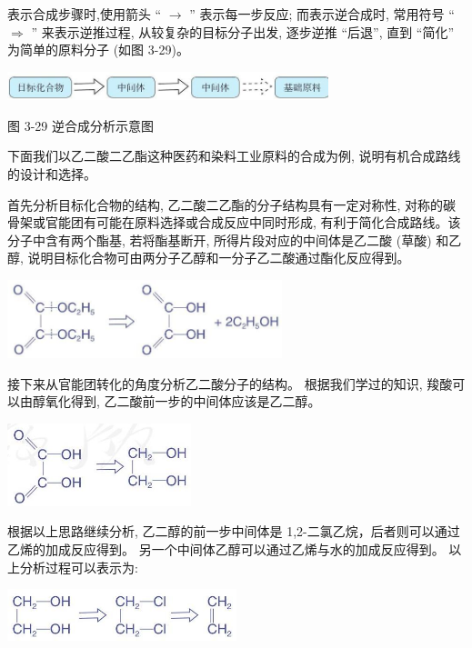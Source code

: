 \documentclass[10pt]{article}
\begin{document}
表示合成步骤时,使用箭头 “ \(\rightarrow\) ” 表示每一步反应; 而表示逆合成时, 常用符号 “ \(\Rightarrow\) ” 来表示逆推过程, 从较复杂的目标分子出发, 逐步逆推 “后退”, 直到 “简化” 为简单的原料分子 (如图 3-29)。

\begin{center}
\includegraphics[max width=0.7\textwidth]{images/0190efc5-b58a-7c43-bfb0-e0a030df9cfd_93_676105.jpg}
\end{center}

图 3-29 逆合成分析示意图

下面我们以乙二酸二乙酯这种医药和染料工业原料的合成为例, 说明有机合成路线的设计和选择。

首先分析目标化合物的结构, 乙二酸二乙酯的分子结构具有一定对称性, 对称的碳骨架或官能团有可能在原料选择或合成反应中同时形成, 有利于简化合成路线。该分子中含有两个酯基, 若将酯基断开, 所得片段对应的中间体是乙二酸 (草酸) 和乙醇, 说明目标化合物可由两分子乙醇和一分子乙二酸通过酯化反应得到。

\begin{center}
\includegraphics[max width=0.6\textwidth]{images/0190efc5-b58a-7c43-bfb0-e0a030df9cfd_93_313496.jpg}
\end{center}

接下来从官能团转化的角度分析乙二酸分子的结构。 根据我们学过的知识, 羧酸可以由醇氧化得到, 乙二酸前一步的中间体应该是乙二醇。

\begin{center}
\includegraphics[max width=0.4\textwidth]{images/0190efc5-b58a-7c43-bfb0-e0a030df9cfd_93_171921.jpg}
\end{center}

根据以上思路继续分析, 乙二醇的前一步中间体是 1,2-二氯乙烷，后者则可以通过乙烯的加成反应得到。 另一个中间体乙醇可以通过乙烯与水的加成反应得到。 以上分析过程可以表示为:

\begin{center}
\includegraphics[max width=0.5\textwidth]{images/0190efc5-b58a-7c43-bfb0-e0a030df9cfd_93_321444.jpg}
\end{center}
\end{document}
